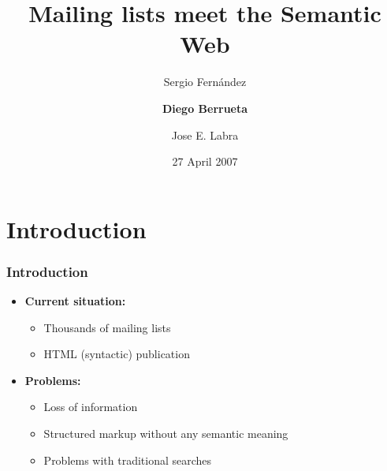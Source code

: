 \documentclass[spanish,notes=hide,16pt]{beamer}
\title{Mailing lists meet the Semantic Web}
\author{
Sergio Fern\'andez\inst{1} 
\and
\textbf{Diego Berrueta}\inst{1} 
\and
Jose E. Labra\inst{2}
}
\institute{%
Fundaci\'on CTIC, \\
Gij\'on, Asturias, Spain,\\
\email{\{sergio.fernandez,diego.berrueta\}@fundacionctic.org} %
\and
Universidad de Oviedo,\\
Computer Science Department,\\
Oviedo, Asturias, Spain,\\
\email{labra@uniovi.es}\\
}
\date{27 April 2007}
\begin{document}


\maketitle

\section{Introduction}
\frame
{
  \frametitle{Introduction}

  \begin{itemize}
   \item<2-> \begin{large}\textbf{Current situation:}\end{large}
	\begin{itemize}
	  \item \begin{large}Thousands of mailing lists\end{large}
	  \item \begin{large}HTML (syntactic) publication\end{large}
	\end{itemize}
   \vspace{1cm}
   \item<3-> \textbf{Problems:}
	\begin{itemize}
	  \item \begin{large}Loss of information\end{large}
	  \item \begin{large}Structured markup without any semantic meaning\end{large}
	  \item \begin{large}Problems with traditional searches\end{large}
	\end{itemize}
  \end{itemize}
}
\end{document}

